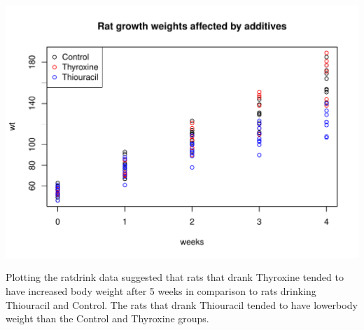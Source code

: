\documentclass[11pt]{article}
\begin{document}
\includegraphics[width=.9\linewidth]{./ratweights.pdf}

Plotting the ratdrink data suggested that rats that drank Thyroxine
tended to have increased body weight after 5 weeks in comparison to rats
drinking Thiouracil and Control. The rats that drank Thiouracil
tended to have lowerbody weight than the Control and Thyroxine groups.
\end{document}
